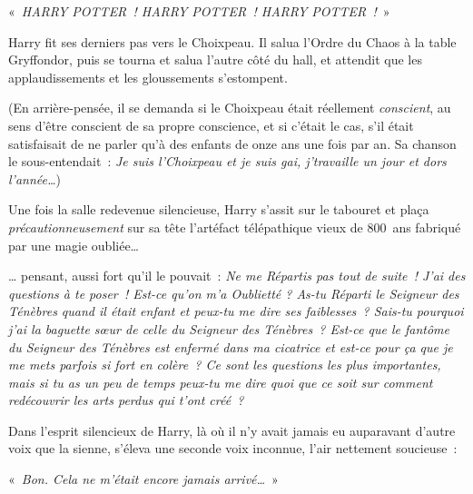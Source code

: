 «~\emph{HARRY POTTER~! HARRY POTTER~! HARRY POTTER~!}~»

Harry fit ses derniers pas vers le Choixpeau.
Il salua l'Ordre du Chaos à la table Gryffondor, puis se tourna et salua l'autre côté du hall, et attendit que les applaudissements et les gloussements s'estompent.

(En arrière-pensée, il se demanda si le Choixpeau était réellement \emph{conscient}, au sens d'être conscient de sa propre conscience, et si c'était le cas, s'il était satisfaisait de ne parler qu'à des enfants de onze ans une fois par an.
Sa chanson le sous-entendait~: \emph{Je suis l'Choixpeau et je suis gai, j'travaille un jour et dors l'année…})

Une fois la salle redevenue silencieuse, Harry s'assit sur le tabouret et plaça \emph{précautionneusement} sur sa tête l'artéfact télépathique vieux de 800~ans fabriqué par une magie oubliée…

… pensant, aussi fort qu'il le pouvait~:
\emph{Ne me Répartis pas tout de suite~! J'ai des questions à te poser~!
Est-ce qu'on m'a Oublietté ?
As-tu Réparti le Seigneur des Ténèbres quand il était enfant et peux-tu me dire ses faiblesses~?
Sais-tu pourquoi j'ai la baguette sœur de celle du Seigneur des Ténèbres~?
Est-ce que le fantôme du Seigneur des Ténèbres est enfermé dans ma cicatrice et est-ce pour ça que je me mets parfois si fort en colère~?
Ce sont les questions les plus importantes, mais si tu as un peu de temps peux-tu me dire quoi que ce soit sur comment redécouvrir les arts perdus qui t'ont créé~?}

Dans l'esprit silencieux de Harry, là où il n'y avait jamais eu auparavant d'autre voix que la sienne, s'éleva une seconde voix inconnue, l'air nettement soucieuse~:

«~\emph{Bon. Cela ne m'était encore jamais arrivé…}~»

